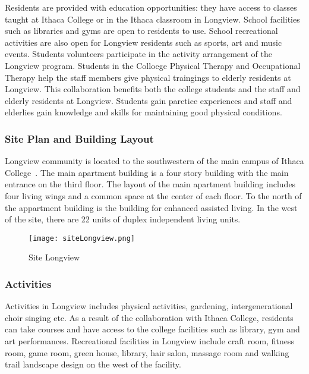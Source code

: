 Residents are provided with education opportunities: they have access
to classes taught at Ithaca College or in the Ithaca classroom in
Longview. School facilities such as libraries and gyms are open to
residents to use. School recreational activities are also open for
Longview residents such as sports, art and music events. Students
volunteers participate in the activity arrangement of the Longview
program. Students in the Colloege Physical Therapy and Occupational
Therapy help the staff members give physical traingings to elderly
residents at Longview. This collaboration benefits both the college
students and the staff and elderly residents at Longview. Students
gain parctice experiences and staff and elderlies gain knowledge and
skills for maintaining good physical conditions.

\subsubsection{Site Plan and Building Layout}
Longview community is located to the southwestern of the main campus
of Ithaca College~\cite{googleMapLongiew}. The main apartment building
is a four story building with the main entrance on the third
floor. The layout of the main apartment building includes four living
wings and a common space at the center of each floor. To the north of
the appartment building is the building for enhanced assisted
living. In the west of the site, there are 22 units of duplex
independent living units.
\begin{figure}[htbp]
  \centering
  \texttt{[image: siteLongview.png]}
  \caption[Site, Longview]{Site Longview~\cite{googleMapLongiew}}
  \label{fig:siteLongview}
\end{figure}

\subsubsection{Activities}
Activities in Longview includes physical activities, gardening,
intergenerational choir singing etc. As a result of the collaboration
with Ithaca College, residents can take courses and have access to  
the college facilities such as library, gym and art
performances. Recreational facilities in Longview include craft room,
fitness room, game room, green house, library, hair salon, massage
room and walking trail landscape design on the west of the facility.

